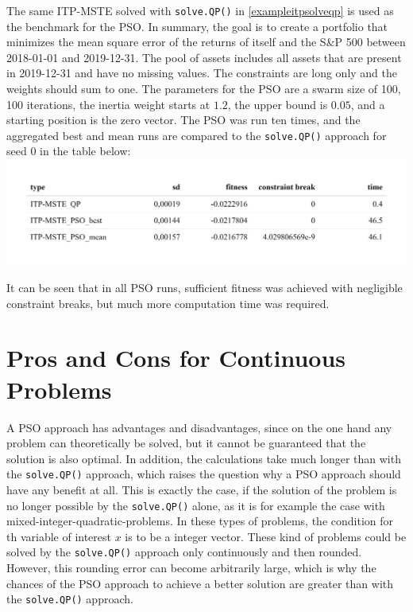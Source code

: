 \documentclass[
  oneside]{book}
\begin{document}
The same ITP-MSTE solved with \texttt{solve.QP()} in \ref{exampleitpsolveqp} is used as the benchmark for the PSO. In summary, the goal is to create a portfolio that minimizes the mean square error of the returns of itself and the S\&P 500 between 2018-01-01 and 2019-12-31. The pool of assets includes all assets that are present in 2019-12-31 and have no missing values. The constraints are long only and the weights should sum to one. The parameters for the PSO are a swarm size of 100, 100 iterations, the inertia weight starts at \(1.2\), the upper bound is \(0.05\), and a starting position is the zero vector. The PSO was run ten times, and the aggregated best and mean runs are compared to the \texttt{solve.QP()} approach for seed 0 in the table below:
\includegraphics{Master_Thesis_files/figure-latex/pso8-1.png}

It can be seen that in all PSO runs, sufficient fitness was achieved with negligible constraint breaks, but much more computation time was required.

\hypertarget{pros-and-cons-for-continuous-problems}{%
\section{Pros and Cons for Continuous Problems}\label{pros-and-cons-for-continuous-problems}}

A PSO approach has advantages and disadvantages, since on the one hand any problem can theoretically be solved, but it cannot be guaranteed that the solution is also optimal. In addition, the calculations take much longer than with the \texttt{solve.QP()} approach, which raises the question why a PSO approach should have any benefit at all. This is exactly the case, if the solution of the problem is no longer possible by the \texttt{solve.QP()} alone, as it is for example the case with mixed-integer-quadratic-problems. In these types of problems, the condition for th variable of interest \(x\) is to be a integer vector. These kind of problems could be solved by the \texttt{solve.QP()} approach only continuously and then rounded. However, this rounding error can become arbitrarily large, which is why the chances of the PSO approach to achieve a better solution are greater than with the \texttt{solve.QP()} approach.
\end{document}
